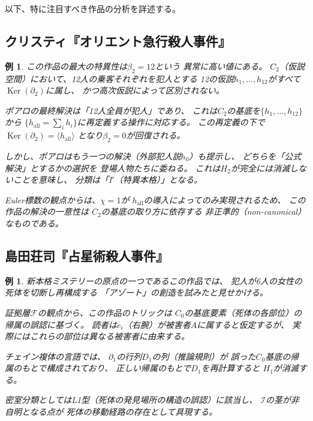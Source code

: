 \documentclass[12pt,twocolumn]{ltjsarticle}
\newtheorem{example}[theorem]{例}
\newcommand{\Ker}{\operatorname{Ker}}
\begin{document}
以下、特に注目すべき作品の分析を詳述する。

\subsection{クリスティ『オリエント急行殺人事件』}

\begin{example}
この作品の最大の特異性は$\beta_2 = 12$という
異常に高い値にある。
$C_2$（仮説空間）において、12人の乗客それぞれを犯人とする
12の仮説$h_1, \ldots, h_{12}$がすべて$\Ker(\partial_2)$に属し、
かつ高次仮説によって区別されない。

ポアロの最終解決は「12人全員が犯人」であり、
これは$C_2$の基底を$\{h_1, \ldots, h_{12}\}$から
$\{h_{\text{all}} = \sum_{i} h_i\}$に再定義する操作に対応する。
この再定義の下で$\Ker(\partial_2) = \langle h_{\text{all}} \rangle$
となり$\beta_2 = 0$が回復される。

しかし、ポアロはもう一つの解決（外部犯人説$h_0$）も提示し、
どちらを「公式解決」とするかの選択を
登場人物たちに委ねる。
これは$H_2$が完全には消滅しないことを意味し、
分類は「I$'$（特異本格）」となる。

Euler標数の観点からは、$\chi = 1$が
$h_{\text{all}}$の導入によってのみ実現されるため、
この作品の解決の一意性は
$C_2$の基底の取り方に依存する
非正準的（non-canonical）なものである。
\end{example}


\subsection{島田荘司『占星術殺人事件』}

\begin{example}
新本格ミステリーの原点の一つであるこの作品では、
犯人が6人の女性の死体を切断し再構成する
「アゾート」の創造を試みたと見せかける。

証拠層$\mathcal{F}$の観点から、この作品のトリックは
$C_0$の基底要素（死体の各部位）の
\emph{帰属の誤認}に基づく。
読者は$e_i$（右腕）が被害者$A$に属すると仮定するが、
実際にはこれらの部位は異なる被害者に由来する。

チェイン複体の言語では、
$\partial_1$の行列$D_1$の列（推論規則）が
誤った$C_0$基底の帰属のもとで構成されており、
正しい帰属のもとで$D_1$を再計算すると
$H_1$が消滅する。

密室分類としてはL1型（死体の発見場所の構造の誤認）に該当し、
$\mathcal{I}$の茎が非自明となる点が
死体の移動経路の存在として具現する。
\end{example}
\end{document}
